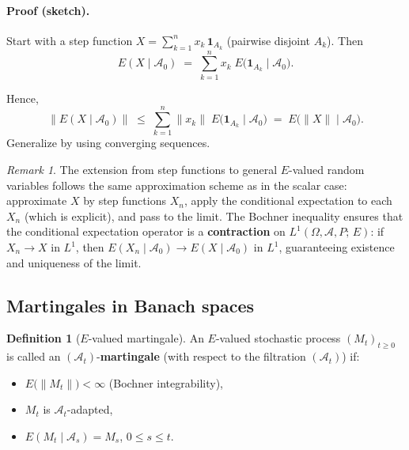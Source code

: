 \documentclass[11pt]{article}
\theoremstyle{definition}
\newtheorem{definition}{Definition}
\theoremstyle{remark}
\newtheorem{remark}{Remark}
\begin{document}
\paragraph{Proof (sketch).}
Start with a step function
$X = \sum_{k=1}^{n} x_k\,\mathbf{1}_{A_k}$
(pairwise disjoint $A_k$).  Then
\[
    E(X \mid \mathcal{A}_0)
    \;=\;
    \sum_{k=1}^{n} x_k\;E\!\bigl(\mathbf{1}_{A_k}
    \mid \mathcal{A}_0\bigr).
\]

Hence,
\[
    \bigl\|E(X \mid \mathcal{A}_0)\bigr\|
    \;\le\;
    \sum_{k=1}^{n} \|x_k\|\;
    E\!\bigl(\mathbf{1}_{A_k} \mid \mathcal{A}_0\bigr)
    \;=\;
    E\!\bigl(\|X\| \mid \mathcal{A}_0\bigr).
\]
Generalize by using converging sequences.

\begin{remark}
The extension from step functions to general $E$-valued random variables follows the same approximation scheme as in the scalar case: approximate $X$ by step functions $X_n$, apply the conditional expectation to each~$X_n$ (which is explicit), and pass to the limit.  The Bochner inequality ensures that the conditional expectation operator is a \textbf{contraction} on $L^1(\Omega, \mathcal{A}, P;\, E)$: if $X_n \to X$ in $L^1$, then $E(X_n \mid \mathcal{A}_0) \to E(X \mid \mathcal{A}_0)$ in $L^1$, guaranteeing existence and uniqueness of the limit.
\end{remark}

\subsection*{Martingales in Banach spaces}

\begin{definition}[$E$-valued martingale]
An $E$-valued stochastic process $(M_t)_{t \ge 0}$ is called an
$(\mathcal{A}_t)$-\textbf{martingale}
(with respect to the filtration $(\mathcal{A}_t)$) if:
\begin{itemize}
    \item[(i)] $E\!\bigl(\|M_t\|\bigr) < \infty$
          \quad (Bochner integrability),
    \item[(ii)] $M_t$ is $\mathcal{A}_t$-adapted,
    \item[(iii)] $E(M_t \mid \mathcal{A}_s) = M_s$,
          \quad $0 \le s \le t$.
\end{itemize}
\end{definition}
\end{document}
